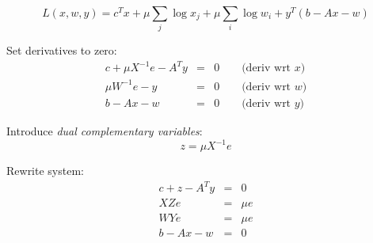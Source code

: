 \begin{slide}
{\begin{mylist}
	\[
	    L(x,w,y) = 
	    c^T x + \mu \sum_j \log x_j + \mu \sum_i \log w_i 
	     + y^T(b - Ax - w) 
	\]
    \item
	Set derivatives to zero:
	\begin{eqnarray*}
	    c + \mu X^{-1} e - A^T y & = & 0 \qquad \mbox{(deriv wrt $x$)} \\
	        \mu W^{-1} e -     y & = & 0 \qquad \mbox{(deriv wrt $w$)} \\
	            b - A x - w      & = & 0 \qquad \mbox{(deriv wrt $y$)} 
	\end{eqnarray*}
    \item
	Introduce {\em dual complementary variables}:
	\[
	    z = \mu X^{-1} e
	\]
    \item
	Rewrite system:
	\begin{eqnarray*}
	           c + z - A^T y & = & 0 \\
			  X Z e  & = & \mu e \\
			  W Y e  & = & \mu e \\
	            b - A x - w  & = & 0 
	\end{eqnarray*}
\end{mylist}

\vfill 
}
\end{slide}

\begin{slide}
\end{slide}

